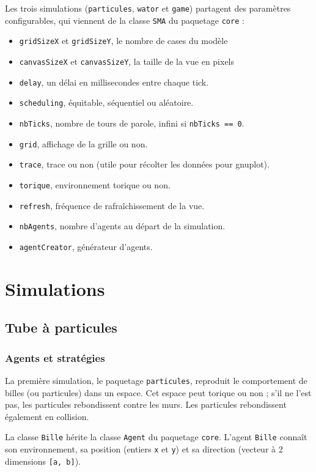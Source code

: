 \documentclass[a4paper]{article}
\begin{document}
Les trois simulations (\texttt{particules}, \texttt{wator} et \texttt{game}) partagent des paramètres configurables, qui viennent de la  classe \texttt{SMA} du paquetage \texttt{core} :
\begin{itemize}
\item \texttt{gridSizeX} et \texttt{gridSizeY}, le nombre de cases du modèle
\item \texttt{canvasSizeX} et \texttt{canvasSizeY}, la taille de la vue en pixels
\item \texttt{delay}, un délai en millisecondes entre chaque tick.
\item \texttt{scheduling}, équitable, séquentiel ou aléatoire.
\item \texttt{nbTicks}, nombre de tours de parole, infini si \texttt{nbTicks == 0}.
\item \texttt{grid}, affichage de la grille ou non.
\item \texttt{trace}, trace ou non (utile pour récolter les données pour gnuplot).
\item \texttt{torique}, environnement torique ou non.
\item \texttt{refresh}, fréquence de rafraîchissement de la vue.
\item \texttt{nbAgents}, nombre d'agents au départ de la simulation.
\item \texttt{agentCreator}, générateur d'agents.
\end{itemize}
\newpage

\section{Simulations}

\subsection{Tube à particules}

\subsubsection{Agents et stratégies}

La première simulation, le paquetage \texttt{particules}, reproduit le comportement de billes (ou particules) dans un espace. Cet espace peut torique ou non ; s'il ne l'est pas, les particules rebondissent contre les murs. Les particules rebondissent également en collision.

\medskip
La classe \texttt{Bille} hérite la classe \texttt{Agent} du paquetage \texttt{core}. L'agent \texttt{Bille} connaît son environnement, sa position (entiers \texttt{x} et \texttt{y}) et sa direction (vecteur à 2 dimensions \texttt{[a, b]}).
\end{document}
